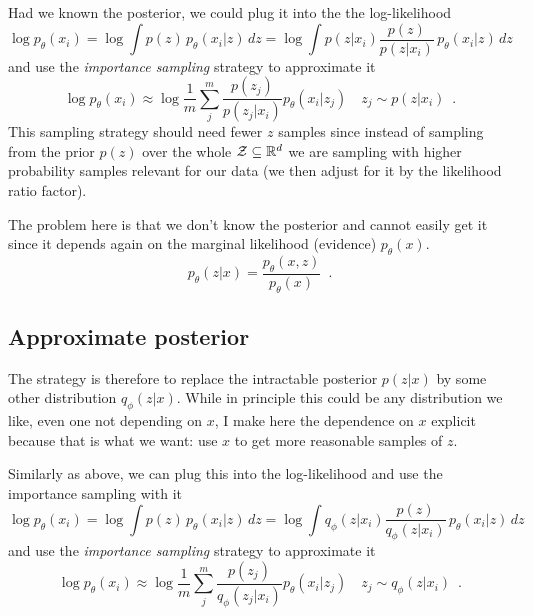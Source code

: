 Had we known the posterior, we could plug it into the the log-likelihood 
\begin{equation}\label{eq:vae_decPosterior}
\log p_{\theta}(x_i) = \log \int p(z) \, p_{\theta}(x_i|z) \, dz
= \log \int p(z|x_i) \frac{p(z)}{p(z|x_i)} \, p_{\theta}(x_i|z) \, dz 
\end{equation} 
and use the \emph{importance sampling} strategy \cite{ImportanceSampling} to approximate it
\begin{equation}\label{eq:vae_importanceSampling}
\log p_{\theta}(x_i) \approx \log \frac{1}{m} \sum_j^m \frac{p(z_j)}{p(z_j|x_i)} p_{\theta}(x_i|z_j)
\quad z_j \sim p(z|x_i) \enspace .
\end{equation}
This sampling strategy should need fewer $z$ samples since instead of sampling from the prior $p(z)$ over the whole $\mathcal{Z} \subseteq \mathbb{R}^d$ we are sampling with higher probability samples relevant for our data (we then adjust for it by the likelihood ratio factor).

The problem here is that we don't know the posterior and cannot easily get it since it depends again on the marginal likelihood (evidence) $p_{\theta}(x)$.
\begin{equation}
p_{\theta}(z|x) = \frac{p_{\theta}(x,z)}{p_{\theta}(x)} \enspace .
\end{equation}


\subsection{Approximate posterior}\label{sec:Vae_approxPosterior}

The strategy is therefore to replace the intractable posterior $p(z|x)$ by some other distribution $q_{\phi}(z|x)$.
While in principle this could be any distribution we like, even one not depending on $x$, I make here the dependence on $x$ explicit because that is what we want: use $x$ to get more reasonable samples of $z$.


Similarly as above, we can plug this into the log-likelihood and use the importance sampling with it
\begin{equation}\label{eq:vae_decApproxPosterior}
\log p_{\theta}(x_i) = \log \int p(z) \, p_{\theta}(x_i|z) \, dz
= \log \int q_{\phi}(z|x_i) \frac{p(z)}{q_{\phi}(z|x_i)} \, p_{\theta}(x_i|z) \, dz 
\end{equation} 
and use the \emph{importance sampling} strategy \cite{ImportanceSampling} to approximate it
\begin{equation}\label{eq:vae_importanceApproxSampling}
\log p_{\theta}(x_i) \approx \log \frac{1}{m} \sum_j^m \frac{p(z_j)}{q_{\phi}(z_j|x_i)} p_{\theta}(x_i|z_j)
\quad z_j \sim q_{\phi}(z|x_i) \enspace .
\end{equation}

